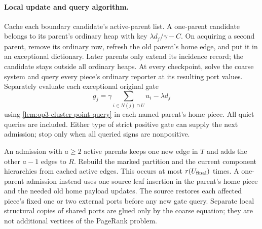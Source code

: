 \paragraph{Local update and query algorithm.}
Cache each boundary candidate's active-parent list. A one-parent candidate
belongs to its parent's ordinary heap with key $\lambda d_j/\gamma-C$.
On acquiring a second parent, remove its ordinary row, refresh the old
parent's home edge, and put it in an exceptional dictionary. Later parents
only extend its incidence record; the candidate stays outside all ordinary
heaps. At every checkpoint, solve the coarse system and query every piece's
ordinary reporter at its resulting port values. Separately evaluate each
exceptional original gate
\[
 g_j=\gamma\sum_{i\in N(j)\cap U}u_i-\lambda d_j
\]
using \cref{lem:op3-cluster-point-query} in each named parent's home piece.
All quiet queries are included. Either type of strict positive gate can
supply the next admission; stop only when all queried signs are nonpositive.

An admission with $a\geq2$ active parents keeps one new edge in $T$ and
adds the other $a-1$ edges to $R$. Rebuild the marked partition and the
current component hierarchies from cached active edges. This occurs at
most $r(U_{\rm final})$ times. A one-parent admission instead uses one
source leaf insertion in the parent's home piece and the needed old home
payload updates. The source restores each affected piece's fixed one or
two external ports before any new gate query. Separate local structural
copies of shared ports are glued only by the coarse equation; they are not
additional vertices of the PageRank problem.


